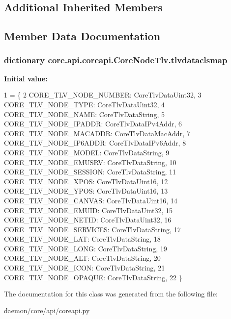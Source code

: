 \subsection*{Additional Inherited Members}


\subsection{Member Data Documentation}
\hypertarget{classcore_1_1api_1_1coreapi_1_1_core_node_tlv_abf03a66b5d9b8e0b5333e5ba2325e076}{
\subsubsection[{tlvdataclsmap}]{\setlength{\rightskip}{0pt plus 5cm}dictionary core.\+api.\+coreapi.\+Core\+Node\+Tlv.\+tlvdataclsmap\hspace{0.3cm}{\ttfamily [static]}}}\label{classcore_1_1api_1_1coreapi_1_1_core_node_tlv_abf03a66b5d9b8e0b5333e5ba2325e076}
{\bfseries Initial value\+:}
\begin{DoxyCode}
1 = \{
2         CORE\_TLV\_NODE\_NUMBER: CoreTlvDataUint32,
3         CORE\_TLV\_NODE\_TYPE: CoreTlvDataUint32,
4         CORE\_TLV\_NODE\_NAME: CoreTlvDataString,
5         CORE\_TLV\_NODE\_IPADDR: CoreTlvDataIPv4Addr,
6         CORE\_TLV\_NODE\_MACADDR: CoreTlvDataMacAddr,
7         CORE\_TLV\_NODE\_IP6ADDR: CoreTlvDataIPv6Addr,
8         CORE\_TLV\_NODE\_MODEL: CoreTlvDataString,
9         CORE\_TLV\_NODE\_EMUSRV: CoreTlvDataString,
10         CORE\_TLV\_NODE\_SESSION: CoreTlvDataString,
11         CORE\_TLV\_NODE\_XPOS: CoreTlvDataUint16,
12         CORE\_TLV\_NODE\_YPOS: CoreTlvDataUint16,
13         CORE\_TLV\_NODE\_CANVAS: CoreTlvDataUint16,
14         CORE\_TLV\_NODE\_EMUID: CoreTlvDataUint32,
15         CORE\_TLV\_NODE\_NETID: CoreTlvDataUint32,
16         CORE\_TLV\_NODE\_SERVICES: CoreTlvDataString,
17         CORE\_TLV\_NODE\_LAT: CoreTlvDataString,
18         CORE\_TLV\_NODE\_LONG: CoreTlvDataString,
19         CORE\_TLV\_NODE\_ALT: CoreTlvDataString,
20         CORE\_TLV\_NODE\_ICON: CoreTlvDataString,
21         CORE\_TLV\_NODE\_OPAQUE: CoreTlvDataString,
22     \}
\end{DoxyCode}


The documentation for this class was generated from the following file\+:\begin{DoxyCompactItemize}
\item 
daemon/core/api/coreapi.\+py\end{DoxyCompactItemize}
